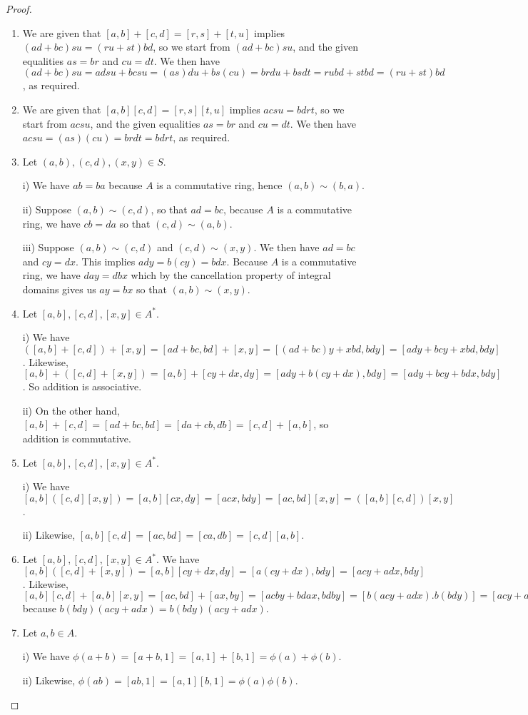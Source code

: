 \begin{proof}
 \begin{enumerate}
     \item We are given that $[a,b]+[c,d]=[r,s]+[t,u]$ implies $(ad+bc)su= (ru+st)bd$, so we start from $(ad+bc)su$, and the given equalities $as=br$ and $cu=dt$. We then have $(ad+bc)su= adsu+bcsu= (as)du+bs(cu)= brdu+bsdt= rubd+stbd= (ru+st)bd$, as required.
     \item We are given that $[a,b][c,d]=[r,s][t,u]$ implies $acsu=bdrt$, so we start from $acsu$, and the given equalities $as=br$ and $cu=dt$. We then have $acsu= (as)(cu)= brdt= bdrt$, as required.
     \item Let $(a,b),(c,d),(x,y)\in S$.

     i) We have $ab=ba$ because $A$ is a commutative ring, hence $(a,b)\sim(b,a)$.

     ii) Suppose $(a,b)\sim(c,d)$, so that $ad=bc$, because $A$ is a commutative ring, we have $cb=da$ so that $(c,d)\sim(a,b)$.

     iii) Suppose $(a,b)\sim(c,d)$ and $(c,d)\sim(x,y)$. We then have $ad=bc$ and $cy=dx$. This implies $ady=b(cy)=bdx$. Because $A$ is a commutative ring, we have $day=dbx$ which by the cancellation property of integral domains gives us $ay=bx$ so that $(a,b)\sim(x,y)$.
     \item Let $[a,b],[c,d],[x,y]\in A^{*}$.

     i) We have $([a,b]+[c,d])+[x,y]= [ad+bc,bd]+[x,y]= [(ad+bc)y+xbd,bdy]= [ady+bcy+xbd, bdy]$. Likewise, $[a,b]+([c,d]+[x,y])= [a,b]+[cy+dx,dy]= [ady+b(cy+dx),bdy]= [ady+bcy+bdx, bdy]$. So addition is associative.

     ii) On the other hand, $[a,b]+[c,d]= [ad+bc,bd]= [da+cb,db]= [c,d]+[a,b]$, so addition is commutative.
     \item Let $[a,b],[c,d],[x,y]\in A^{*}$.

     i) We have $[a,b]([c,d][x,y])= [a,b][cx,dy]= [acx,bdy]= [ac,bd][x,y]= ([a,b][c,d])[x,y]$.

     ii) Likewise, $[a,b][c,d]= [ac,bd]= [ca,db]= [c,d][a,b]$.
     \item Let $[a,b],[c,d],[x,y]\in A^{*}$. We have $[a,b]([c,d]+[x,y])= [a,b][cy+dx,dy]= [a(cy+dx),bdy]= [acy+adx,bdy]$. Likewise, $[a,b][c,d]+[a,b][x,y]= [ac,bd]+[ax,by]= [acby+bdax,bdby]= [b(acy+adx).b(bdy)]= [acy+adx,bdy]$ because $b(bdy)(acy+adx)=b(bdy)(acy+adx)$.
     \item Let $a,b\in A$.
     
     i) We have $\phi(a+b)= [a+b,1]= [a,1]+[b,1]= \phi(a)+\phi(b)$.

     ii) Likewise, $\phi(ab)= [ab,1]= [a,1][b,1]= \phi(a)\phi(b)$.
 \end{enumerate}
\end{proof}


